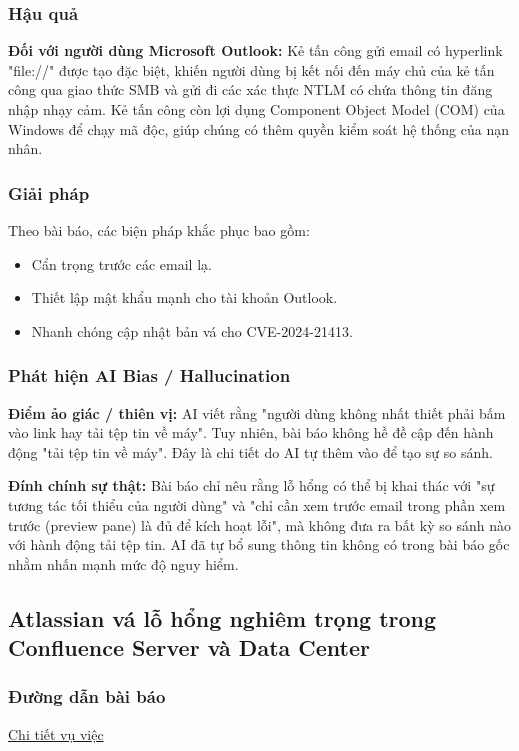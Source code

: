 \subsubsection{Hậu quả}
\textbf{Đối với người dùng Microsoft Outlook:} Kẻ tấn công gửi email có hyperlink "file://" được tạo đặc biệt, khiến người dùng bị kết nối đến máy chủ của kẻ tấn công qua giao thức SMB và gửi đi các xác thực NTLM có chứa thông tin đăng nhập nhạy cảm. Kẻ tấn công còn lợi dụng Component Object Model (COM) của Windows để chạy mã độc, giúp chúng có thêm quyền kiểm soát hệ thống của nạn nhân.

\subsubsection{Giải pháp}
Theo bài báo, các biện pháp khắc phục bao gồm:

\begin{itemize}
    \item Cẩn trọng trước các email lạ.
    \item Thiết lập mật khẩu mạnh cho tài khoản Outlook.
    \item Nhanh chóng cập nhật bản vá cho CVE-2024-21413.
\end{itemize}

\subsubsection{Phát hiện AI Bias / Hallucination}

\textbf{Điểm ảo giác / thiên vị:}
AI viết rằng "người dùng không nhất thiết phải bấm vào link hay tải tệp tin về máy". Tuy nhiên, bài báo không hề đề cập đến hành động "tải tệp tin về máy". Đây là chi tiết do AI tự thêm vào để tạo sự so sánh.

\textbf{Đính chính sự thật:}
Bài báo chỉ nêu rằng lỗ hổng có thể bị khai thác với "sự tương tác tối thiểu của người dùng" và "chỉ cần xem trước email trong phần xem trước (preview pane) là đủ để kích hoạt lỗi", mà không đưa ra bất kỳ so sánh nào với hành động tải tệp tin. AI đã tự bổ sung thông tin không có trong bài báo gốc nhằm nhấn mạnh mức độ nguy hiểm.

\subsection{Atlassian vá lỗ hổng nghiêm trọng trong Confluence Server và Data Center}

\subsubsection{Đường dẫn bài báo}
\href{https://whitehat.vn/threads/atlassian-va-lo-hong-nghiem-trong-trong-confluence-server-va-confluence-data-center.16741/}{Chi tiết vụ việc}


